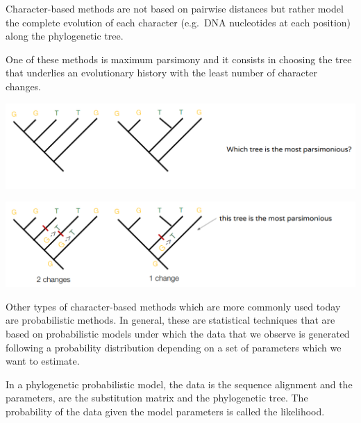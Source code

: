 \documentclass[
  letterpaper,
]{book}
\begin{document}
Character-based methods are not based on pairwise distances but rather
model the complete evolution of each character (e.g.~DNA nucleotides at
each position) along the phylogenetic tree.

One of these methods is maximum parsimony and it consists in choosing
the tree that underlies an evolutionary history with the least number of
character changes.

\includegraphics{assets/images/chapters/phylogenomics/17.png}

\includegraphics{assets/images/chapters/phylogenomics/18.png}

Other types of character-based methods which are more commonly used
today are probabilistic methods. In general, these are statistical
techniques that are based on probabilistic models under which the data
that we observe is generated following a probability distribution
depending on a set of parameters which we want to estimate.

In a phylogenetic probabilistic model, the data is the sequence
alignment and the parameters, are the substitution matrix and the
phylogenetic tree. The probability of the data given the model
parameters is called the likelihood.
\end{document}
